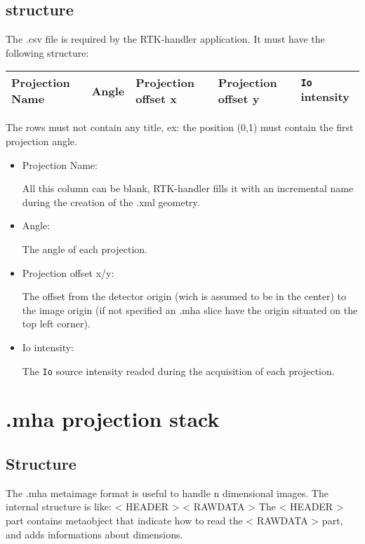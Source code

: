 \documentclass[a4paper,11pt, oneside]{article}
\begin{document}
    \subsection{ structure }
    The .csv file is required by the RTK-handler application. It must have the following structure:
    
    \begin{table}[H]
    \centering
    \begin{tabular}{|l|l|l|l|l|}
    \hline
    Projection Name & Angle & Projection offset x & Projection offset y & \texttt{Io} intensity \\ \hline
    \end{tabular}
    \end{table}
    
    The rows must not contain any title, ex: the position (0,1) must contain the first projection angle.
    \begin{itemize}
    \item Projection Name:
      \par All this column can be blank, RTK-handler fills it with an incremental name during the creation of the .xml geometry.
    \item Angle:
      \par The angle of each projection.
    \item Projection offset x/y:
      \par The offset from the detector origin (wich is assumed to be in the center) to the image origin (if not specified an .mha slice have the origin situated on the top left corner).
    \item Io intensity:
    \par The \texttt{Io} source intensity readed during the acquisition of each projection.
    \end{itemize}
    
    \section{ .mha projection stack }
    \subsection{ Structure }
    The .mha metaimage format is useful to handle n dimensional images. The
    internal structure is like:
    \newline
    \newline
    < HEADER >
    \newline
    < RAWDATA >
    \newline
    \newline 
    The < HEADER > part contains metaobject that indicate how to read the < RAWDATA > part, and adds informations about dimensions.
\end{document}
